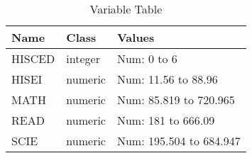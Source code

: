 \begin{table}[!htbp] \centering \renewcommand*{\arraystretch}{1.1}\caption{Variable Table}
\begin{tabular}{p{}p{}p{}}
\hline
\hline
Name & Class & Values \\ 
\hline
HISCED & integer & Num: 0 to 6 \\ 
HISEI & numeric & Num: 11.56 to 88.96 \\ 
MATH & numeric & Num: 85.819 to 720.965 \\ 
READ & numeric & Num: 181 to 666.09 \\ 
SCIE & numeric & Num: 195.504 to 684.947\\ 
\hline
\hline
\end{tabular}
\end{table}

